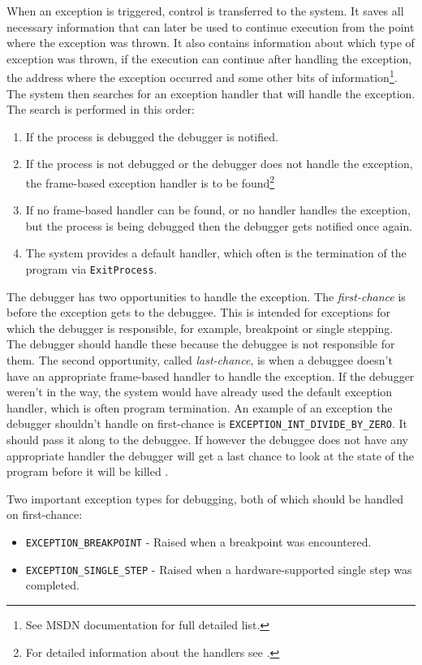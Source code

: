 When an exception is triggered, control is transferred to the system. It saves
all necessary information that can later be used to continue execution from the
point where the exception was thrown. It also contains information about which
type of exception was thrown, if the execution can continue after handling the
exception, the address where the exception occurred and some other bits of
information\footnote{See MSDN documentation \cite{windows-msdn-seh} for full
detailed list.}. The system then searches for an exception handler that will
handle the exception. The search is performed in this order:

\begin{enumerate}
    \item If the process is debugged the debugger is notified.
    \item If the process is not debugged or the debugger does not handle the
        exception, the frame-based exception handler is to be
        found\footnote{For detailed information about the handlers see
        \cite{windows-msdn-seh}.}
    \item If no frame-based handler can be found, or no handler handles the
        exception, but the process is being debugged then the debugger gets
        notified once again.
    \item The system provides a default handler, which often is the termination of
        the program via \texttt{ExitProcess}.
\end{enumerate}

The debugger has two opportunities to handle the exception. The
\textit{first-chance} is before the exception gets to the debuggee. This is
intended for exceptions for which the debugger is responsible, for example,
breakpoint or single stepping. The debugger should handle these because the
debuggee is not responsible for them. The second opportunity, called
\textit{last-chance}, is when a debuggee doesn't have an appropriate frame-based
handler to handle the exception. If the debugger weren't in the way, the system
would have already used the default exception handler, which is often program
termination. An example of an exception the debugger shouldn't handle on
first-chance is \texttt{EXCEPTION\_INT\_DIVIDE\_BY\_ZERO}. It should pass it
along to the debuggee. If however the debuggee does not have any appropriate
handler the debugger will get a last chance to look at the state of the program
before it will be killed \cite{windows-msdn-dbg-exc-handling}.

Two important exception types for debugging, both of which should be handled on
first-chance:
\begin{itemize}
    \item \texttt{EXCEPTION\_BREAKPOINT} - Raised when a breakpoint was encountered.
    \item \texttt{EXCEPTION\_SINGLE\_STEP} - Raised when a hardware-supported
        single step was completed.
\end{itemize}

